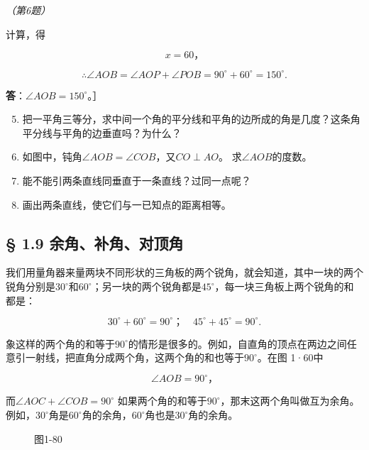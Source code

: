 \emph{（第6题）}

计算，得

\[
x = 60\text{，}
\]

\[
\therefore \angle AOB = \angle AOP + \angle POB = 90 ^{\circ} + 60 ^{\circ} = 150 ^{\circ}.
\]

\textbf{答}：\(\angle AOB=150^{\circ}\)。］

\begin{enumerate}
\setcounter{enumi}{4}
\item
  把一平角三等分，求中间一个角的平分线和平角的边所成的角是几度？这条角平分线与平角的边垂直吗？为什么？
\item
  如图中，钝角\(\angle AOB = \angle COB\)，又\(CO \perp AO\)。
  求\(\angle AOB\)的度数。
\item
  能不能引两条直线同垂直于一条直线？过同一点呢？
\item
  画出两条直线，使它们与一已知点的距离相等。
\end{enumerate}

\subsection{§ 1.9
余角、补角、对顶角}

我们用量角器来量两块不同形状的三角板的两个锐角，就会知道，其中一块的两个锐角分别是\(30^{\circ}\)和\(60^{\circ}\)；另一块的两个锐角都是\(45^{\circ}\)，每一块三角板上两个锐角的和都是：

\[
30 ^{\circ} + 60 ^{\circ} = 90 ^{\circ}\text{；} \quad 45 ^{\circ} + 45 ^{\circ} = 90 ^{\circ}.
\]

象这样的两个角的和等于\(90^{\circ}\)的情形是很多的。例如，自直角的顶点在两边之间任意引一射线，把直角分成两个角，这两个角的和也等于\(90^{\circ}\)。在图
1·60中

\[
\angle AOB = 90 ^{\circ}\text{，}
\]

而\(\angle AOC + \angle COB = 90^{\circ}\)
如果两个角的和等于\(90^{\circ}\)，那末这两个角叫做互为余角。例如，\(30^{\circ}\)角是\(60^{\circ}\)角的余角，\(60^{\circ}\)角也是\(30^{\circ}\)角的余角。

\begin{figure}
\centering
{}
\caption{图1-80}
\end{figure}

